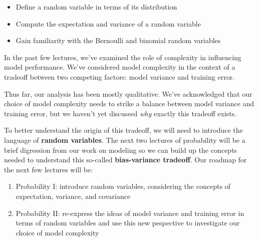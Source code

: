 \documentclass[
  letterpaper,
  DIV=11,
  numbers=noendperiod]{scrreprt}
\providecommand{\tightlist}{%
  \setlength{\itemsep}{0pt}\setlength{\parskip}{0pt}}\usepackage{longtable,booktabs,array}
\begin{document}
\begin{tcolorbox}[enhanced jigsaw, breakable, colbacktitle=quarto-callout-note-color!10!white, colback=white, opacitybacktitle=0.6, opacityback=0, bottomrule=.15mm, titlerule=0mm, toptitle=1mm, bottomtitle=1mm, left=2mm, colframe=quarto-callout-note-color-frame, title=\textcolor{quarto-callout-note-color}{\faInfo}\hspace{0.5em}{Note}, rightrule=.15mm, toprule=.15mm, leftrule=.75mm, arc=.35mm, coltitle=black]

\begin{itemize}
\tightlist
\item
  Define a random variable in terms of its distribution
\item
  Compute the expectation and variance of a random variable
\item
  Gain familiarity with the Bernoulli and binomial random variables
\end{itemize}

\end{tcolorbox}

In the past few lectures, we've examined the role of complexity in
influencing model performance. We've considered model complexity in the
context of a tradeoff between two competing factors: model variance and
training error.

Thus far, our analysis has been mostly qualitative. We've acknowledged
that our choice of model complexity needs to strike a balance between
model variance and training error, but we haven't yet discussed
\emph{why} exactly this tradeoff exists.

To better understand the origin of this tradeoff, we will need to
introduce the language of \textbf{random variables}. The next two
lectures of probability will be a brief digression from our work on
modeling so we can build up the concepts needed to understand this
so-called \textbf{bias-variance tradeoff}. Our roadmap for the next few
lectures will be:

\begin{enumerate}
\def\labelenumi{\arabic{enumi}.}
\tightlist
\item
  Probability I: introduce random variables, considering the concepts of
  expectation, variance, and covariance
\item
  Probability II: re-express the ideas of model variance and training
  error in terms of random variables and use this new pespective to
  investigate our choice of model complexity
\end{enumerate}
\end{document}
